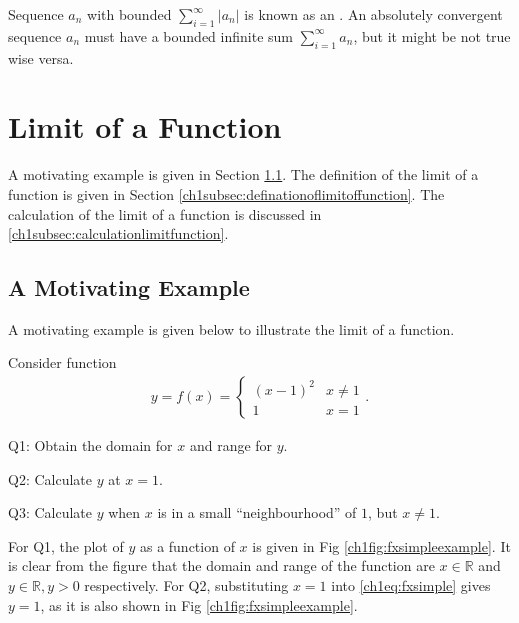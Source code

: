 Sequence $a_n$ with bounded $\sum_{i=1}^{\infty}|a_n|$ is known as an . An absolutely convergent sequence $a_n$ must have a bounded infinite sum $\sum_{i=1}^{\infty}a_n$, but it might be not true wise versa.

\section{Limit of a Function} \label{ch1sec:limitofafunction}

A motivating example is given in Section \ref{ch1subsec:functionmotivatingexample}. The definition of the limit of a function is given in Section \ref{ch1subsec:definationoflimitoffunction}. The calculation of the limit of a function is discussed in \ref{ch1subsec:calculationlimitfunction}.

\subsection{A Motivating Example} \label{ch1subsec:functionmotivatingexample}

A motivating example is given below to illustrate the limit of a function.

\begin{shortbox}

Consider function
\begin{eqnarray}
  y = f(x) = \left\{\begin{array}{cc}
                    (x-1)^2 & x \neq 1 \\
                    1 & x = 1
                  \end{array}\right.. \label{ch1eq:fxsimple}
\end{eqnarray}

Q1: Obtain the domain for $x$ and range for $y$.

Q2: Calculate $y$ at $x = 1$.

Q3: Calculate $y$ when $x$ is in a small ``neighbourhood'' of $1$, but $x \neq 1$.

\end{shortbox}

For Q1, the plot of $y$ as a function of $x$ is given in Fig \ref{ch1fig:fxsimpleexample}. It is clear from the figure that the domain and range of the function are $x\in \mathbb{R}$ and $y\in \mathbb{R}, y > 0$ respectively. For Q2, substituting $x=1$ into \eqref{ch1eq:fxsimple} gives $y=1$, as it is also shown in Fig \ref{ch1fig:fxsimpleexample}.

